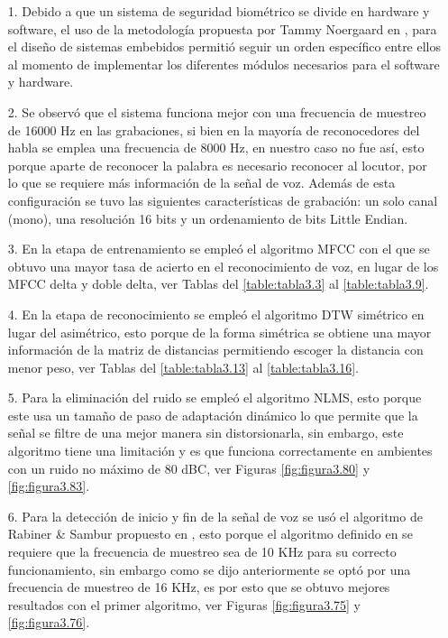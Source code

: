 \begin{enumerate}
\item[1.]Debido a que un sistema de seguridad biométrico se divide en hardware y software, el uso de la metodología propuesta por Tammy Noergaard en \citep{tammy}, para el diseño de sistemas embebidos permitió seguir un orden específico entre ellos al momento de implementar los diferentes módulos necesarios para el software y hardware.

\item[2.]Se observó que el sistema funciona mejor con una frecuencia de muestreo de 16000 Hz en las grabaciones, si bien en la mayoría de reconocedores del habla se emplea una frecuencia de 8000 Hz, en nuestro caso no fue así, esto porque aparte de reconocer la palabra es necesario reconocer al locutor, por lo que se requiere más información de la señal de voz. Además de esta configuración se tuvo las siguientes características de grabación: un solo canal (mono), una resolución 16 bits y un ordenamiento de bits Little Endian.

\item[3.]En la etapa de entrenamiento se empleó el algoritmo MFCC con el que se obtuvo una mayor tasa de acierto en el reconocimiento de voz, en lugar de los MFCC delta y doble delta, ver Tablas del \ref{table:tabla3.3} al \ref{table:tabla3.9}.

\item[4.]En la etapa de reconocimiento se empleó el algoritmo DTW simétrico en lugar del asimétrico, esto porque de la forma simétrica se obtiene una mayor información de la matriz de distancias permitiendo escoger la distancia con menor peso, ver Tablas del \ref{table:tabla3.13} al \ref{table:tabla3.16}.

\item[5.]Para la eliminación del ruido se empleó el algoritmo NLMS, esto porque este usa un tamaño de paso de adaptación dinámico lo que permite que la señal se filtre de una mejor manera sin distorsionarla, sin embargo, este algoritmo tiene una limitación y es que funciona correctamente en ambientes con un ruido no máximo de 80 dBC, ver Figuras \ref{fig:figura3.80} y \ref{fig:figura3.83}.

\item[6.]Para la detección de inicio y fin de la señal de voz se usó el algoritmo de Rabiner \& Sambur propuesto en \citep{unam}, esto porque el algoritmo definido en \citep{rabiner} se requiere que la frecuencia de muestreo sea de 10 KHz para su correcto funcionamiento, sin embargo como se dijo anteriormente se optó por una frecuencia de muestreo de 16 KHz, es por esto que se obtuvo mejores resultados con el primer algoritmo, ver Figuras \ref{fig:figura3.75} y \ref{fig:figura3.76}.


\end{enumerate}
